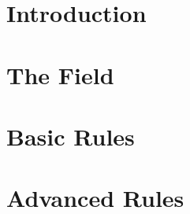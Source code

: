 \documentclass[10pt]{article}
\begin{document}
    \renewcommand*\contentsname{Table of Contents}
    \tableofcontents

    \newpage

    \section{Introduction}
    \section{The Field}
    \section{Basic Rules}
    \section{Advanced Rules}
\end{document}

